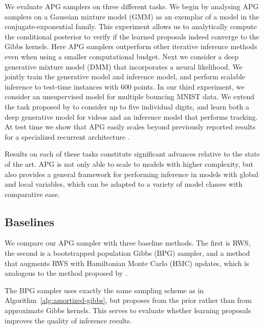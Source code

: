 \documentclass{article}
\theoremstyle{definition}
\begin{document}
We evaluate APG samplers on three different tasks. 
We begin by analysing APG samplers on a Gaussian mixture model (GMM) as an exemplar of a model in the conjugate-exponential family. 
This experiment allows us to analytically compute the conditional posterior to verify if the learned proposals indeed converge to the Gibbs kernels.
Here APG samplers outperform other iterative inference methods even when using a smaller computational budget. 
Next we consider a deep generative mixture model (DMM) that incorporates a neural likelihood. We jointly train the generative model and inference model, and perform scalable inference to test-time instances with 600 points. 
In our third experiment, we consider an unsupervised model for multiple bouncing MNIST data. We extend the task proposed by \citet{srivastava2015unsupervised} to consider up to five individual digits, and learn both a deep generative model for videos and an inference model that performs tracking. At test time we show that APG easily scales beyond previously reported results for a specialized recurrent architecture \cite{kosiorek2018sequential}. 

Results on each of these tasks constitute significant advances relative to the state of the art. APG is not only able to scale to models with higher complexity, but also provides a general framework for performing inference in models with global and local variables, which can be adapted to a variety of model classes with comparative ease. 


\subsection{Baselines}
\label{sec:baselines}

We compare our APG sampler with three baseline methods. The first is RWS, the second is a bootstrapped population Gibbs (BPG) sampler, and a method that augments RWS with Hamiltonian Monte Carlo (HMC) updates, which is analogous to the method proposed by \citet{hoffman2017learning}.

The BPG sampler uses exactly the same sampling scheme as in Algorithm~\ref{alg:amortized-gibbs}, but proposes from the prior rather than from  approximate Gibbs kernels. This serves  to evaluate whether learning proposals improves the quality of inference results. 
\end{document}
